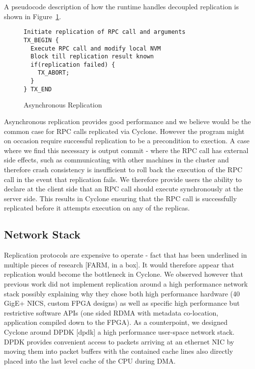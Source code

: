 \documentclass[twocolumn]{article}
\begin{document}
A pseudocode description of how the runtime handles decoupled replication is
shown in Figure~\ref{fig:async_rep}.

\begin{figure}
{ \scriptsize
\begin{verbatim}
Initiate replication of RPC call and arguments
TX_BEGIN {
  Execute RPC call and modify local NVM
  Block till replication result known
  if(replication failed) {
    TX_ABORT;
  }
} TX_END
\end{verbatim}
}
\caption{Asynchronous Replication}
\label{fig:async_rep}
\end{figure}

Asynchronous replication provides good performance and we believe would be the
common case for RPC calls replicated via Cyclone. However the program might on
occasion require successful replication to be a precondition to exection. A case
where we find this necessary is output commit - where the RPC call has external
side effects, such as communicating with other machines in the cluster and
therefore crash consistency is insufficient to roll back the execution of the
RPC call in the event that replication fails. We therefore provide users the
ability to declare at the client side that an RPC call should execute
synchronously at the server side. This results in Cyclone ensuring that the RPC
call is successfully replicated before it attempts execution on any of the
replicas.

\subsection{Network Stack}
Replication protocols are expensive to operate - fact that has been underlined in
multiple pieces of research [FARM, in a box]. It would therefore appear that
replication would become the bottleneck in Cyclone. We observed however that
previous work did not implement replication around a high performance network
stack possibly explaining why they chose both high performance hardware (40
GigE+ NICS, custom FPGA designs) as well as specific high performance but
restrictive software APIs (one sided RDMA with metadata co-location, application
compiled down to the FPGA). As a counterpoint, we designed Cyclone around DPDK
[dpdk] a high performance user-space network stack. DPDK provides convenient
access to packets arriving at an ethernet NIC by moving them into packet buffers
with the contained cache lines also directly placed into the last level cache of
the CPU during DMA.
\end{document}
